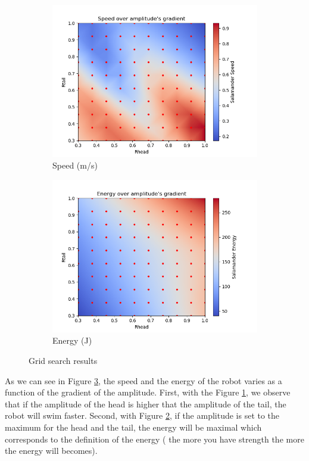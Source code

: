 \documentclass{cmc}
\begin{document}
 \begin{figure}[H] 
  \begin{subfigure}[b]{0.5\linewidth}
    \centering
    \includegraphics[width=0.9\linewidth]{figures/Speed_8c.png} 
    \caption{Speed (m/s)} 
    \label{fig:exercise8c_results:a} 
  \end{subfigure}%
  \begin{subfigure}[b]{0.5\linewidth}
    \centering
    \includegraphics[width=0.9\linewidth]{figures/Energy_8c.png} 
    \caption{Energy (J)} 
    \label{fig:exercise8c_results:b} 
  \end{subfigure}
  \caption{Grid search results}
  \label{fig:exercise8c_results} 
\end{figure}

As we can see in Figure \ref{fig:exercise8c_results}, the speed and the energy of the robot varies as a function of the gradient of the amplitude. First, with the Figure \ref{fig:exercise8c_results:a}, we observe that if the amplitude of the head is higher that the amplitude of the tail, the robot will swim faster. Second, with Figure \ref{fig:exercise8c_results:b}, if the amplitude is set to the maximum for the head and the tail, the energy will be maximal which corresponds to the definition of the energy ( the more you have strength the more the energy will becomes). 
\end{document}
